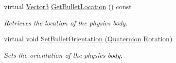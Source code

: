 \begin{DoxyCompactItemize}
virtual \hyperlink{classphys_1_1Vector3}{Vector3} \hyperlink{classphys_1_1ActorBase_a9b32df1efdc346f5d6c0920b959c09a3}{GetBulletLocation} () const 
\begin{DoxyCompactList}\small\item\em Retrieves the location of the physics body. \item\end{DoxyCompactList}\item 
virtual void \hyperlink{classphys_1_1ActorBase_a492244ac46ced53b809f436da992bc84}{SetBulletOrientation} (\hyperlink{classphys_1_1Quaternion}{Quaternion} Rotation)
\begin{DoxyCompactList}\small\item\em Sets the orientation of the physics body. \item\end{DoxyCompactList}\end{DoxyCompactItemize}
